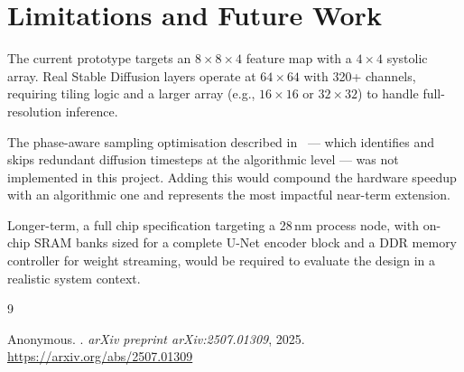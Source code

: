 \documentclass[11pt, letterpaper]{article}
\begin{document}
\section{Limitations and Future Work}

The current prototype targets an $8 \times 8 \times 4$ feature map with a
$4\times4$ systolic array. Real Stable Diffusion layers operate at
$64\times64$ with 320+ channels, requiring tiling logic and a larger array
(e.g., $16\times16$ or $32\times32$) to handle full-resolution inference.

The phase-aware sampling optimisation described in~\cite{sdacc2025} — which
identifies and skips redundant diffusion timesteps at the algorithmic level —
was not implemented in this project. Adding this would compound the hardware
speedup with an algorithmic one and represents the most impactful near-term
extension.

Longer-term, a full chip specification targeting a 28\,nm process node, with
on-chip SRAM banks sized for a complete U-Net encoder block and a DDR memory
controller for weight streaming, would be required to evaluate the design in a
realistic system context.


\begin{thebibliography}{9}

Anonymous.
.
\newblock \textit{arXiv preprint arXiv:2507.01309}, 2025.
\newblock \url{https://arxiv.org/abs/2507.01309}

\end{thebibliography}
\end{document}
